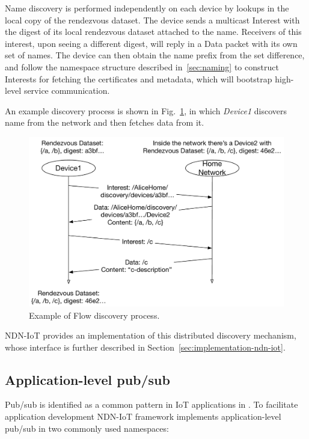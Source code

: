 Name discovery is performed independently on each device by lookups in the local copy of the rendezvous dataset. 
The device sends a multicast Interest with the digest of its local rendezvous dataset attached to the name. 
Receivers of this interest, upon seeing a different digest, will reply in a Data packet with its own set of names. 
The device can then obtain the name prefix from the set difference, and follow the namespace structure described in~\ref{sec:naming} to construct Interests for fetching the certificates and metadata, which will bootstrap high-level service communication.

An example discovery process is shown in Fig.~\ref{fig:flow-discovery-process}, in which \textit{Device1} discovers name  from the network and then fetches data from it.

\begin{figure}[!t]
\centering
\includegraphics[width=0.95\columnwidth]{flow-discovery-process.pdf}
\caption{Example of Flow discovery process.}
\label{fig:flow-discovery-process}
\end{figure}

NDN-IoT provides an implementation of this distributed discovery mechanism, whose interface is further described in Section~\ref{sec:implementation-ndn-iot}.

\subsection{Application-level pub/sub}

Pub/sub is identified as a common pattern in IoT applications in \cite{ndn-iot}.
To facilitate application development NDN-IoT framework implements application-level pub/sub in two commonly used namespaces: 

